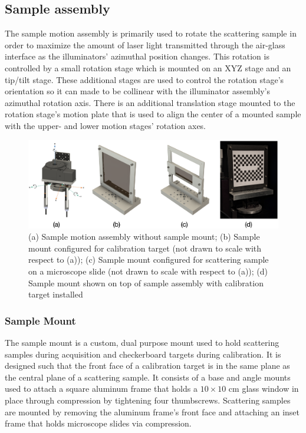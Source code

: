\subsection{Sample assembly}
The sample motion assembly is primarily used to rotate the scattering sample in order to maximize the amount of laser light transmitted through the air-glass interface as the illuminators' azimuthal position changes. This rotation is controlled by a small rotation stage which is mounted on an XYZ stage and an tip/tilt stage. These additional stages are used to control the rotation stage's orientation so it can made to be collinear with the illuminator assembly's azimuthal rotation axis. There is an additional translation stage mounted to the rotation stage's motion plate that is used to align the center of a mounted sample with the upper- and lower motion stages' rotation axes.
\begin{figure}
    \centering
    \includegraphics[width=\linewidth]{figures/sample_assembly_summary.png}
    \caption{(a) Sample motion assembly without sample mount; (b) Sample mount configured for calibration target (not drawn to scale with respect to (a)); (c) Sample mount configured for scattering sample on a microscope slide (not drawn to scale with respect to (a)); (d) Sample mount shown on top of sample assembly with calibration target installed}
    \label{fig:sample_motion_assy}
\end{figure}

\subsubsection{Sample Mount}
The sample mount is a custom, dual purpose mount used to hold scattering samples during acquisition and checkerboard targets during calibration. It is designed such that the front face of a calibration target is in the same plane as the central plane of a scattering sample. It consists of a base and angle mounts used to attach a square aluminum frame that holds a $10 \times 10$ cm glass window in place through compression by tightening four thumbscrews. Scattering samples are mounted by removing the aluminum frame's front face and attaching an inset frame that holds microscope slides via compression.